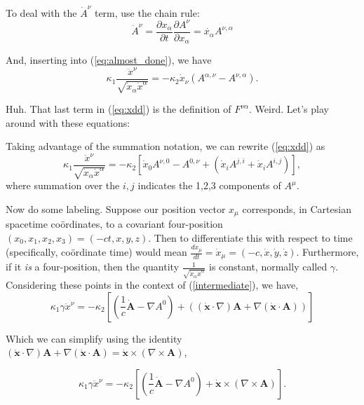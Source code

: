 \documentclass[11pt]{article}
\begin{document}
To deal with the $\dot{A}^\nu$ term, use the chain rule:
\begin{equation}
\dot{A}^\nu = \frac{\partial x_\alpha}{\partial t}\frac{\partial A^\nu}{\partial x_\alpha} = \dot{x_\alpha} A^{\nu,\alpha}
\end{equation}

And, inserting into (\ref{eq:almost_done}), we have
\begin{equation}\label{eq:xdd}
\kappa_1\frac{\ddot{x}^\nu}{\sqrt{\dot{x}_\alpha\dot{x}^\alpha}} = -\kappa_2 \dot{x}_\nu\left(A^{\alpha,\nu} - A^{\nu,\alpha}\right).
\end{equation}

Huh.  That last term in (\ref{eq:xdd}) is the definition of $F^{\nu\alpha}$.  Weird.  Let's play around with these equations:

Taking advantage of the summation notation, we can rewrite (\ref{eq:xdd}) as
\begin{equation}\label{eq:intermediate}
\kappa_1\frac{\ddot{x}^\nu}{\sqrt{\dot{x}_\alpha\dot{x}^\alpha}} =  -\kappa_2 \left[\dot{x}_0 A^{\nu,0} - A^{0,\nu} + \left(\dot{x}_i A^{j,i} + \dot{x}_i A^{i,j}\right)\right],
\end{equation}
where summation over the $i,j$ indicates the 1,2,3 components of $A^\mu$.

Now do some labeling.  Suppose our position vector $x_\mu$ corresponds, in Cartesian spacetime co\"{o}rdinates, to a covariant four-position $\left(x_0,x_1,x_2,x_3\right) = \left(-ct,x,y,z\right)$.  Then to differentiate this with respect to time (specifically, co\"{o}rdinate time) would mean $\frac{dx_\mu}{dt} =\dot{x}_\mu = \left(-c,\dot{x},\dot{y},\dot{z}\right)$.  Furthermore, if it \emph{is} a four-position, then the quantity $\frac{1}{{\sqrt{\dot{x}_\alpha\dot{x}^\alpha}}}$ is constant, normally called $\gamma$. Considering these points in the context of (\ref{intermediate}), we have,
\begin{equation}
\kappa_1\gamma\ddot{x}^\nu = -\kappa_2\left[\left(\frac{1}{c}\dot{\mathbf{A}} - \nabla A^{0}\right) + \left(\left(\dot{\mathbf{x}} \cdotp\nabla\right) \mathbf{A} + \nabla \left(\dot{\mathbf{x}}\cdotp \mathbf{A}\right)\right)\right]
\end{equation}

Which we can simplify using the identity $\left(\dot{\mathbf{x}} \cdotp\nabla\right) \mathbf{A} + \nabla \left(\dot{\mathbf{x}}\cdotp \mathbf{A}\right) = \mathbf{\dot{x}} \times (\nabla \times \mathbf{A})$,

\begin{equation}
\kappa_1\gamma\ddot{x}^\nu = -\kappa_2\left[\left(\frac{1}{c}\dot{\mathbf{A}} - \nabla A^{0}\right) + \mathbf{\dot{x}} \times (\nabla \times \mathbf{A})\right].
\end{equation}
\end{document}
